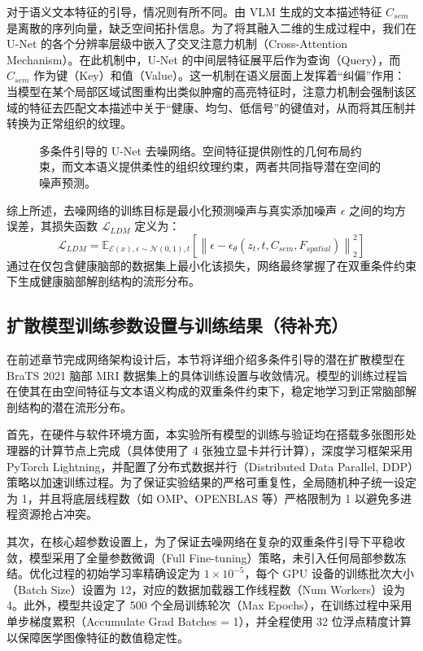 \documentclass[Win]{xjtuBSThesis}  %
\begin{document}
对于语义文本特征的引导，情况则有所不同。由 VLM 生成的文本描述特征 $C_{sem}$ 是离散的序列向量，缺乏空间拓扑信息。为了将其融入二维的生成过程中，我们在 U-Net 的各个分辨率层级中嵌入了交叉注意力机制（Cross-Attention Mechanism）。在此机制中，U-Net 的中间层特征展平后作为查询（Query），而 $C_{sem}$ 作为键（Key）和值（Value）。这一机制在语义层面上发挥着“纠偏”作用：当模型在某个局部区域试图重构出类似肿瘤的高亮特征时，注意力机制会强制该区域的特征去匹配文本描述中关于“健康、均匀、低信号”的键值对，从而将其压制并转换为正常组织的纹理。

\begin{figure}[htbp]
    \centering
    \caption{多条件引导的 U-Net 去噪网络。空间特征提供刚性的几何布局约束，而文本语义提供柔性的组织纹理约束，两者共同指导潜在空间的噪声预测。}
    \label{fig:dual_condition_unet}
\end{figure}

综上所述，去噪网络的训练目标是最小化预测噪声与真实添加噪声 $\epsilon$ 之间的均方误差，其损失函数 $\mathcal{L}_{LDM}$ 定义为：
$$\mathcal{L}_{LDM} = \mathbb{E}_{\mathcal{E}(x), \epsilon \sim \mathcal{N}(0, 1), t} \left[ \left\| \epsilon - \epsilon_\theta(z_t, t, C_{sem}, F_{spatial}) \right\|_2^2 \right]$$
通过在仅包含健康脑部的数据集上最小化该损失，网络最终掌握了在双重条件约束下生成健康脑部解剖结构的流形分布。


\subsection{扩散模型训练参数设置与训练结果（待补充）}
\label{subsec:model_training}
在前述章节完成网络架构设计后，本节将详细介绍多条件引导的潜在扩散模型在 BraTS 2021 脑部 MRI 数据集上的具体训练设置与收敛情况。模型的训练过程旨在使其在由空间特征与文本语义构成的双重条件约束下，稳定地学习到正常脑部解剖结构的潜在流形分布。

首先，在硬件与软件环境方面，本实验所有模型的训练与验证均在搭载多张图形处理器的计算节点上完成（具体使用了 4 张独立显卡并行计算），深度学习框架采用 PyTorch Lightning，并配置了分布式数据并行（Distributed Data Parallel, DDP）策略以加速训练过程。为了保证实验结果的严格可重复性，全局随机种子统一设定为 1，并且将底层线程数（如 OMP、OPENBLAS 等）严格限制为 1 以避免多进程资源抢占冲突。

其次，在核心超参数设置上，为了保证去噪网络在复杂的双重条件引导下平稳收敛，模型采用了全量参数微调（Full Fine-tuning）策略，未引入任何局部参数冻结。优化过程的初始学习率精确设定为 $1 \times 10^{-5}$，每个 GPU 设备的训练批次大小（Batch Size）设置为 12，对应的数据加载器工作线程数（Num Workers）设为 4。此外，模型共设定了 500 个全局训练轮次（Max Epochs），在训练过程中采用单步梯度累积（Accumulate Grad Batches = 1），并全程使用 32 位浮点精度计算以保障医学图像特征的数值稳定性。
\end{document}
